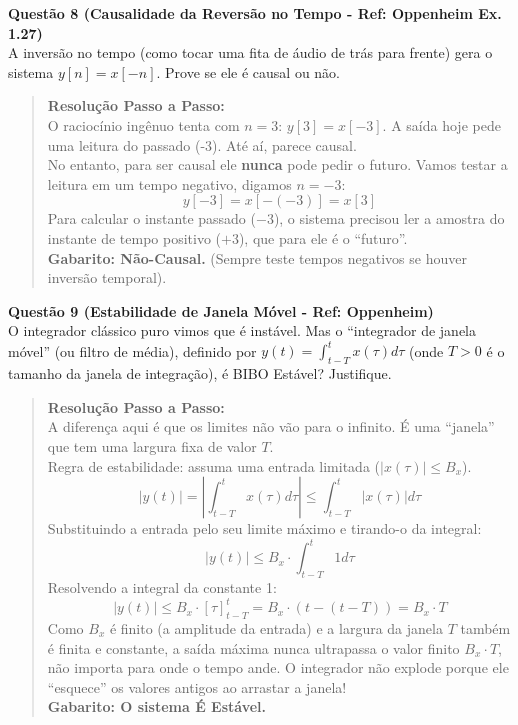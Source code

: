 \textbf{Questão 8 (Causalidade da Reversão no Tempo - Ref: Oppenheim Ex. 1.27)}\\
A inversão no tempo (como tocar uma fita de áudio de trás para frente) gera o sistema \(y[n] = x[-n]\). Prove se ele é causal ou não.

\begin{quote}
\textbf{Resolução Passo a Passo:}\\
O raciocínio ingênuo tenta com \(n=3\): \(y[3] = x[-3]\). A saída hoje pede uma leitura do passado (-3). Até aí, parece causal.\\
No entanto, para ser causal ele \textbf{nunca} pode pedir o futuro. Vamos testar a leitura em um tempo negativo, digamos \(n = -3\):
\[y[-3] = x[-(-3)] = x[3]\]
Para calcular o instante passado (\(-3\)), o sistema precisou ler a amostra do instante de tempo positivo (\(+3\)), que para ele é o ``futuro''.\\
\textbf{Gabarito: Não-Causal.} (Sempre teste tempos negativos se houver inversão temporal).
\end{quote}

\textbf{Questão 9 (Estabilidade de Janela Móvel - Ref: Oppenheim)}\\
O integrador clássico puro vimos que é instável. Mas o ``integrador de janela móvel'' (ou filtro de média), definido por \(y(t) = \int_{t-T}^{t} x(\tau) d\tau\) (onde \(T > 0\) é o tamanho da janela de integração), é BIBO Estável? Justifique.

\begin{quote}
\textbf{Resolução Passo a Passo:}\\
A diferença aqui é que os limites não vão para o infinito. É uma ``janela'' que tem uma largura fixa de valor \(T\).\\
Regra de estabilidade: assuma uma entrada limitada (\(|x(\tau)| \le B_x\)).
\[|y(t)| = \left| \int_{t-T}^{t} x(\tau) d\tau \right| \le \int_{t-T}^{t} |x(\tau)| d\tau\]
Substituindo a entrada pelo seu limite máximo e tirando-o da integral:
\[|y(t)| \le B_x \cdot \int_{t-T}^{t} 1 d\tau\]
Resolvendo a integral da constante 1:
\[|y(t)| \le B_x \cdot [ \tau ]_{t-T}^{t} = B_x \cdot (t - (t-T)) = B_x \cdot T\]
Como \(B_x\) é finito (a amplitude da entrada) e a largura da janela \(T\) também é finita e constante, a saída máxima nunca ultrapassa o valor finito \(B_x \cdot T\), não importa para onde o tempo ande. O integrador não explode porque ele ``esquece'' os valores antigos ao arrastar a janela!\\
\textbf{Gabarito: O sistema É Estável.}
\end{quote}
